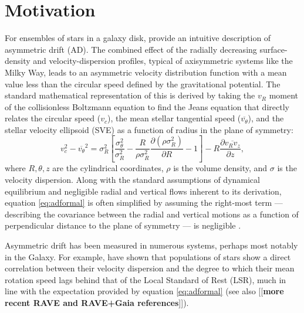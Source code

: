 \documentclass[apj,iop,revtex4,numberedappendix]{emulateapj}
\newcommand{\comment}[2][todo]{{\color{#1}[[{\bf #2}]]}}
\begin{document}

\section{ Motivation }
\label{sec:intro}

For ensembles of stars in a galaxy disk, \citet[][Section
4.4.3]{2008gady.book.....B} provide an intuitive description of
asymmetric drift (AD).  The combined effect of the radially decreasing
surface-density and velocity-dispersion profiles, typical of
axisymmetric systems like the Milky Way, leads to an asymmetric velocity
distribution function with a mean value less than the circular speed
defined by the gravitational potential.  The standard mathematical
representation of this is derived by taking the $v_R$ moment of the
collisionless Boltzmann equation to find the Jeans equation
\citep{Jeans1919} that directly relates the circular speed ($v_c$), the
mean stellar tangential speed ($\overline{v_\theta}$), and the stellar
velocity ellipsoid (SVE) as a function of radius in the plane of
symmetry:
%
\begin{equation}
%
v_c^2 - \overline{v_\theta}^2 = \sigma_R^2\left[
\frac{\sigma_\theta^2}{\sigma_R^2} -
\frac{R}{\rho\sigma_R^2}\frac{\partial(\rho\sigma_R^2)}{\partial R} -
1\right] - R\frac{\partial\overline{v_R v_z}}{\partial z},
%
\label{eq:adformal}
%
\end{equation}
%
where $R,\theta,z$ are the cylindrical coordinates, $\rho$ is the volume
density, and $\sigma$ is the velocity dispersion.  Along with the
standard assumptions of dynamical equilibrium and negligible radial and
vertical flows inherent to its derivation, equation \ref{eq:adformal} is
often simplified by assuming the right-most term --- describing the
covariance between the radial and vertical motions as a function of
perpendicular distance to the plane of symmetry --- is negligible
\citep[cf.][]{1991ApJ...368...79A}.

Asymmetric drift has been measured in numerous systems, perhaps most
notably in the Galaxy.  For example, \citet{1998MNRAS.298..387D} have
shown that populations of stars show a direct correlation between their
velocity dispersion and the degree to which their mean rotation speed
lags behind that of the Local Standard of Rest (LSR), much in line with
the expectation provided by equation \ref{eq:adformal} (see also
\comment{more recent RAVE and RAVE+Gaia references}).
\end{document}
